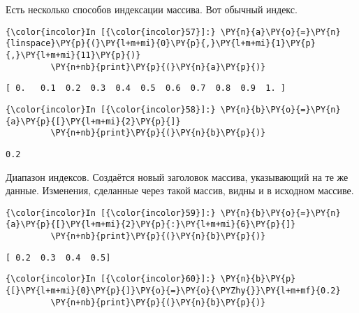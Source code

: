     Есть несколько способов индексации массива. Вот обычный индекс.

    \begin{Verbatim}[commandchars=\\\{\}]
{\color{incolor}In [{\color{incolor}57}]:} \PY{n}{a}\PY{o}{=}\PY{n}{linspace}\PY{p}{(}\PY{l+m+mi}{0}\PY{p}{,}\PY{l+m+mi}{1}\PY{p}{,}\PY{l+m+mi}{11}\PY{p}{)}
         \PY{n+nb}{print}\PY{p}{(}\PY{n}{a}\PY{p}{)}
\end{Verbatim}

    \begin{Verbatim}[commandchars=\\\{\}]
[ 0.   0.1  0.2  0.3  0.4  0.5  0.6  0.7  0.8  0.9  1. ]

    \end{Verbatim}

    \begin{Verbatim}[commandchars=\\\{\}]
{\color{incolor}In [{\color{incolor}58}]:} \PY{n}{b}\PY{o}{=}\PY{n}{a}\PY{p}{[}\PY{l+m+mi}{2}\PY{p}{]}
         \PY{n+nb}{print}\PY{p}{(}\PY{n}{b}\PY{p}{)}
\end{Verbatim}

    \begin{Verbatim}[commandchars=\\\{\}]
0.2

    \end{Verbatim}

    Диапазон индексов. Создаётся новый заголовок массива, указывающий на те
же данные. Изменения, сделанные через такой массив, видны и в исходном
массиве.

    \begin{Verbatim}[commandchars=\\\{\}]
{\color{incolor}In [{\color{incolor}59}]:} \PY{n}{b}\PY{o}{=}\PY{n}{a}\PY{p}{[}\PY{l+m+mi}{2}\PY{p}{:}\PY{l+m+mi}{6}\PY{p}{]}
         \PY{n+nb}{print}\PY{p}{(}\PY{n}{b}\PY{p}{)}
\end{Verbatim}

    \begin{Verbatim}[commandchars=\\\{\}]
[ 0.2  0.3  0.4  0.5]

    \end{Verbatim}

    \begin{Verbatim}[commandchars=\\\{\}]
{\color{incolor}In [{\color{incolor}60}]:} \PY{n}{b}\PY{p}{[}\PY{l+m+mi}{0}\PY{p}{]}\PY{o}{=}\PY{o}{\PYZhy{}}\PY{l+m+mf}{0.2}
         \PY{n+nb}{print}\PY{p}{(}\PY{n}{b}\PY{p}{)}
\end{Verbatim}

